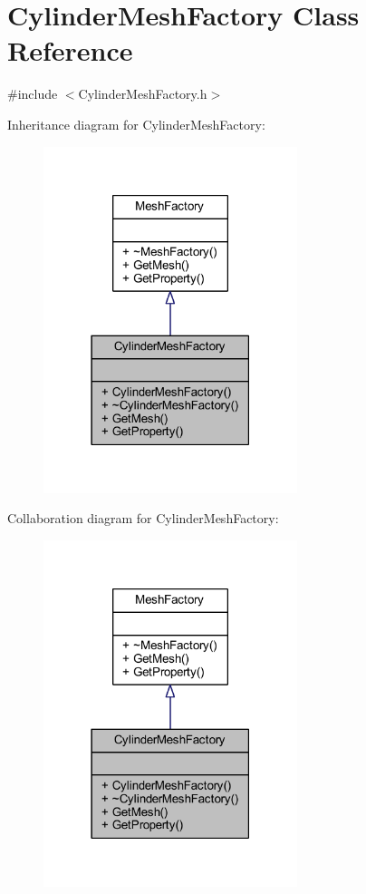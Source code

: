 \hypertarget{class_cylinder_mesh_factory}{}\section{Cylinder\+Mesh\+Factory Class Reference}
\label{class_cylinder_mesh_factory}


{\ttfamily \#include $<$Cylinder\+Mesh\+Factory.\+h$>$}



Inheritance diagram for Cylinder\+Mesh\+Factory\+:
\nopagebreak
\begin{figure}[H]
\begin{center}
\leavevmode
\includegraphics[width=210pt]{class_cylinder_mesh_factory__inherit__graph}
\end{center}
\end{figure}


Collaboration diagram for Cylinder\+Mesh\+Factory\+:
\nopagebreak
\begin{figure}[H]
\begin{center}
\leavevmode
\includegraphics[width=210pt]{class_cylinder_mesh_factory__coll__graph}
\end{center}
\end{figure}
